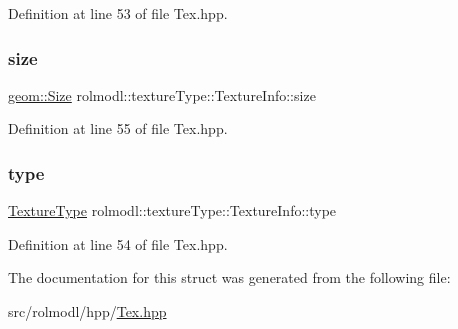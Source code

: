 Definition at line 53 of file Tex.\+hpp.

\mbox{\label{structrolmodl_1_1texture_type_1_1_texture_info_acb1baad1cee55d6feabfa0750cfcb56a}} 
\subsubsection{\texorpdfstring{size}{size}}
{\footnotesize\ttfamily \mbox{\hyperlink{structrolmodl_1_1geom_1_1_size}{geom\+::\+Size}} rolmodl\+::texture\+Type\+::\+Texture\+Info\+::size}



Definition at line 55 of file Tex.\+hpp.

\mbox{\label{structrolmodl_1_1texture_type_1_1_texture_info_af9cd3800d1e121e3a365b7f017d88277}} 
\subsubsection{\texorpdfstring{type}{type}}
{\footnotesize\ttfamily \mbox{\hyperlink{namespacerolmodl_a7090840be12da261b3a8af5852e9f4fd}{Texture\+Type}} rolmodl\+::texture\+Type\+::\+Texture\+Info\+::type}



Definition at line 54 of file Tex.\+hpp.



The documentation for this struct was generated from the following file\+:\begin{DoxyCompactItemize}
\item 
src/rolmodl/hpp/\mbox{\hyperlink{_tex_8hpp}{Tex.\+hpp}}\end{DoxyCompactItemize}
